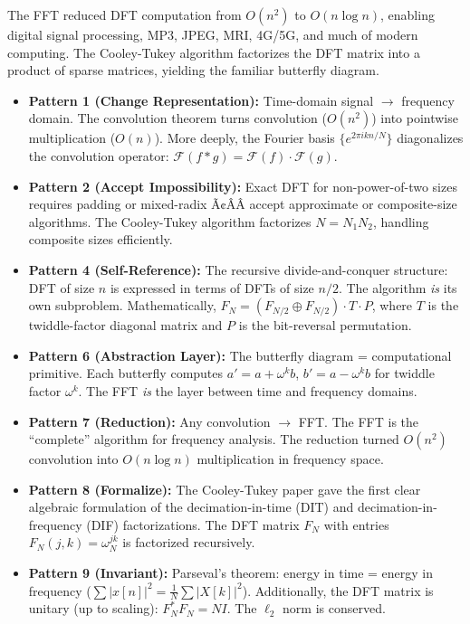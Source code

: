 The FFT reduced DFT computation from $O(n^2)$ to $O(n \log n)$, enabling digital signal processing, MP3, JPEG, MRI, 4G/5G, and much of modern computing. The Cooley-Tukey algorithm factorizes the DFT matrix into a product of sparse matrices, yielding the familiar butterfly diagram.

\begin{itemize}
\item \textbf{Pattern 1 (Change Representation):} Time-domain signal $\to$ frequency domain. The convolution theorem turns convolution ($O(n^2)$) into pointwise multiplication ($O(n)$). More deeply, the Fourier basis $\{e^{2\pi i k n / N}\}$ diagonalizes the convolution operator: $\mathcal{F}(f * g) = \mathcal{F}(f) \cdot \mathcal{F}(g)$.

\item \textbf{Pattern 2 (Accept Impossibility):} Exact DFT for non-power-of-two sizes requires padding or mixed-radix Ã¢ÂÂ accept approximate or composite-size algorithms. The Cooley-Tukey algorithm factorizes $N = N_1 N_2$, handling composite sizes efficiently.

\item \textbf{Pattern 4 (Self-Reference):} The recursive divide-and-conquer structure: DFT of size $n$ is expressed in terms of DFTs of size $n/2$. The algorithm \emph{is} its own subproblem. Mathematically, $F_N = (F_{N/2} \oplus F_{N/2}) \cdot T \cdot P$, where $T$ is the twiddle-factor diagonal matrix and $P$ is the bit-reversal permutation.

\item \textbf{Pattern 6 (Abstraction Layer):} The butterfly diagram = computational primitive. Each butterfly computes $a' = a + \omega^k b$, $b' = a - \omega^k b$ for twiddle factor $\omega^k$. The FFT \emph{is} the layer between time and frequency domains.

\item \textbf{Pattern 7 (Reduction):} Any convolution $\to$ FFT. The FFT is the ``complete'' algorithm for frequency analysis. The reduction turned $O(n^2)$ convolution into $O(n \log n)$ multiplication in frequency space.

\item \textbf{Pattern 8 (Formalize):} The Cooley-Tukey paper gave the first clear algebraic formulation of the decimation-in-time (DIT) and decimation-in-frequency (DIF) factorizations. The DFT matrix $F_N$ with entries $F_N(j,k) = \omega_N^{jk}$ is factorized recursively.

\item \textbf{Pattern 9 (Invariant):} Parseval's theorem: energy in time = energy in frequency ($\sum |x[n]|^2 = \frac{1}{N} \sum |X[k]|^2$). Additionally, the DFT matrix is unitary (up to scaling): $F_N^* F_N = N I$. The $\ell_2$ norm is conserved.
\end{itemize}

